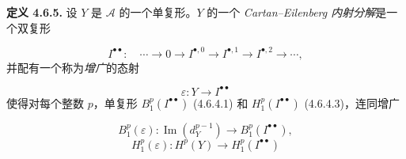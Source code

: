 \medskip\noindent\textbf{定义 4.6.5.}\quad
设 $Y$ 是 $\mathcal A$ 的一个单复形。$Y$ 的一个
\emph{Cartan--Eilenberg 内射分解}是一个双复形

\[
I^{\bullet\bullet}\colon\quad
\cdots\longrightarrow0\longrightarrow I^{\bullet,0}
\longrightarrow I^{\bullet,1}\longrightarrow I^{\bullet,2}
\longrightarrow\cdots,
\]
并配有一个称为\emph{增广}的态射

\[
\varepsilon\colon Y\longrightarrow I^{\bullet\bullet}
\]
使得对每个整数 $p$，单复形
$B_1^p(I^{\bullet\bullet})$ (4.6.4.1) 和
$H_1^p(I^{\bullet\bullet})$ (4.6.4.3)，连同增广

\[
B_1^p(\varepsilon)\colon
\operatorname{Im}(d_Y^{p-1})\longrightarrow B_1^p(I^{\bullet\bullet}),
\]
\[
H_1^p(\varepsilon)\colon
H^p(Y)\longrightarrow H_1^p(I^{\bullet\bullet})
\]
\endgroup
